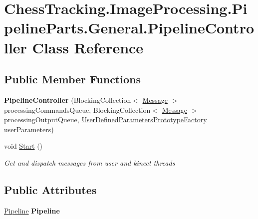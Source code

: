 \hypertarget{class_chess_tracking_1_1_image_processing_1_1_pipeline_parts_1_1_general_1_1_pipeline_controller}{}\section{Chess\+Tracking.\+Image\+Processing.\+Pipeline\+Parts.\+General.\+Pipeline\+Controller Class Reference}
\label{class_chess_tracking_1_1_image_processing_1_1_pipeline_parts_1_1_general_1_1_pipeline_controller}
\subsection*{Public Member Functions}
\begin{DoxyCompactItemize}
\item 
\mbox{\label{class_chess_tracking_1_1_image_processing_1_1_pipeline_parts_1_1_general_1_1_pipeline_controller_aaeb4f88b08efd3dab5592f57796cd82e}} 
{\bfseries Pipeline\+Controller} (Blocking\+Collection$<$ \mbox{\hyperlink{class_chess_tracking_1_1_multithreading_messages_1_1_message}{Message}} $>$ processing\+Commands\+Queue, Blocking\+Collection$<$ \mbox{\hyperlink{class_chess_tracking_1_1_multithreading_messages_1_1_message}{Message}} $>$ processing\+Output\+Queue, \mbox{\hyperlink{class_chess_tracking_1_1_image_processing_1_1_pipeline_data_1_1_user_defined_parameters_prototype_factory}{User\+Defined\+Parameters\+Prototype\+Factory}} user\+Parameters)
\item 
void \mbox{\hyperlink{class_chess_tracking_1_1_image_processing_1_1_pipeline_parts_1_1_general_1_1_pipeline_controller_a520ab9038b88bfa8de4b96d320dc3e71}{Start}} ()
\begin{DoxyCompactList}\small\item\em Get and dispatch messages from user and kinect threads \end{DoxyCompactList}\end{DoxyCompactItemize}
\subsection*{Public Attributes}
\begin{DoxyCompactItemize}
\item 
\mbox{\label{class_chess_tracking_1_1_image_processing_1_1_pipeline_parts_1_1_general_1_1_pipeline_controller_ae5c4eff5fb1fa01b166963d38fcbca3a}} 
\mbox{\hyperlink{class_chess_tracking_1_1_image_processing_1_1_pipeline_parts_1_1_general_1_1_pipeline}{Pipeline}} {\bfseries Pipeline}
\end{DoxyCompactItemize}
